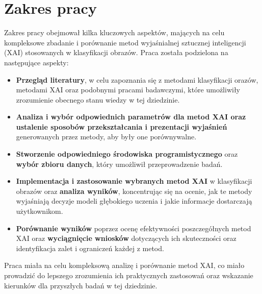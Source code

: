 \section*{Zakres pracy}
Zakres pracy obejmował kilka kluczowych aspektów, mających na celu kompleksowe zbadanie i porównanie metod wyjaśnialnej sztucznej inteligencji (XAI) stosowanych w klasyfikacji obrazów.
Praca została podzielona na następujące aspekty:
\begin{itemize}
	\item \textbf{Przegląd literatury}, w celu zapoznania się z metodami klasyfikacji orazów, metodami XAI oraz podobnymi pracami badawczymi, które umożliwiły zrozumienie obecnego stanu wiedzy w tej dziedzinie.
	\item \textbf{Analiza i wybór odpowiednich parametrów dla metod XAI oraz ustalenie sposobów przekształcania i prezentacji wyjaśnień} generowanych przez metody, aby były one porównywalne.
	\item \textbf{Stworzenie odpowiedniego środowiska programistycznego} oraz \textbf{wybór zbioru danych}, który umożliwił przeprowadzenie badań.
	\item \textbf{Implementacja i zastosowanie wybranych metod XAI} w klasyfikacji obrazów oraz \textbf{analiza wyników}, koncentrując się na ocenie, jak te metody wyjaśniają decyzje modeli głębokiego uczenia i jakie informacje dostarczają użytkownikom.
	\item \textbf{Porównanie wyników} poprzez ocenę efektywności poszczegółnych metod XAI oraz \textbf{wyciągnięcie wniosków} dotyczących ich skuteczności oraz identyfikacja zalet i ograniczeń każdej z metod.
\end{itemize}

Praca miała na celu kompleksową analizę i porównanie metod XAI, co miało prowadzić do lepszego zrozumienia ich praktycznych zastosowań oraz wskazanie kierunków dla przyszłych badań w tej dziedzinie.
